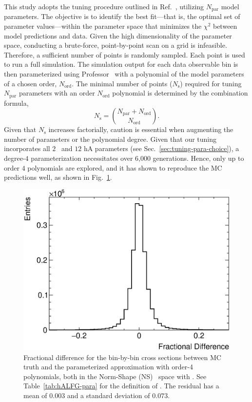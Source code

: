 This study adopts the tuning procedure outlined in Ref.~\cite{GENIE:2022qrc}, utilizing $N_{\textrm{par}}$ model parameters. 
The objective is to identify the best fit---that is, the optimal set of parameter values---within the parameter space that minimizes the $\chi^2$ between model predictions and data. 
Given the high dimensionality of the parameter space, conducting a brute-force, point-by-point scan on a grid is infeasible. 
Therefore, a sufficient number of points is randomly sampled. 
Each point is used to run a full simulation. 
The simulation output for each data observable bin is then parameterized using Professor~\cite{Buckley:2009bj} with a polynomial of the model parameters of a chosen order, $N_{\textrm{ord}}$. 
The minimal number of points ($N_{\textrm{s}}$) required for tuning $N_{\textrm{par}}$ parameters with an order $N_{\textrm{ord}}$ polynomial is determined by the combination formula,
\begin{equation}
    N_{\textrm{s}} = \binom{N_{\textrm{par}}+N_{\textrm{ord}}}{N_{\textrm{ord}}}.
\end{equation}
Given that $N_\textrm{s}$ increases factorially, caution is essential when augmenting the number of parameters or the polynomial degree. 
Given that our tuning incorporates all $2$ \sfcfg\ and $12$ hA parameters (see Sec.~\ref{sec:tuning-para-choice}), a degree-$4$ parameterization  necessitates over 6,000 generations. 
Hence, only up to order $4$ polynomials are explored, and it has shown to reproduce the MC predictions well, as shown in Fig.~\ref{fig:residual}. 

\begin{figure}[!htb] 	
    \centering 		
    \includegraphics[width=\sgfigwid\textwidth]{figures/tuning/residual.eps}
    \caption{\label{fig:residual} Fractional difference for the bin-by-bin cross sections between MC truth and the parameterized approximation with order-4 polynomials,  both in the Norm-Shape (NS)~\cite{DAgostini:1993arp,Hanson:2005mrg} space with \allpar. See Table~\ref{tab:hALFG-para} for the definition of \allpar. The residual has a mean of $0.003$ and a standard deviation of $0.073$.} 
\end{figure}

